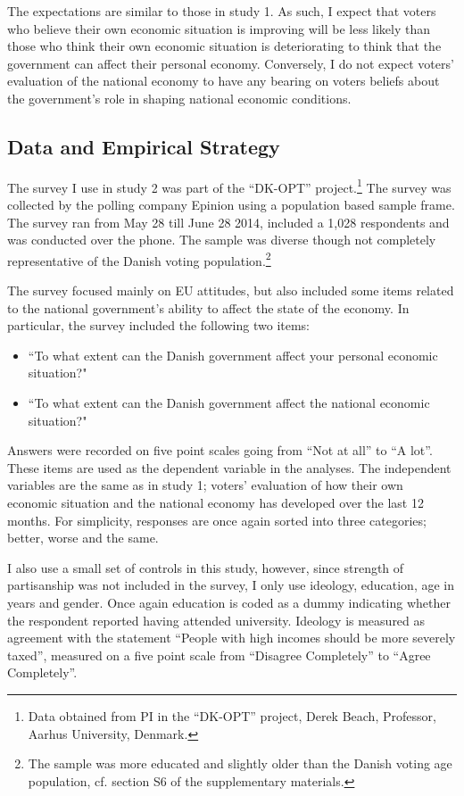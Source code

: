 \documentclass[a4paper,11pt]{article}
\begin{document}
	
	The expectations are similar to those in study 1. As such, I expect that voters who believe their own economic situation is improving will be less likely than those who think their own economic situation is deteriorating to think that the government can affect their personal economy.  Conversely, I do not expect voters' evaluation of the national economy to have any bearing on voters beliefs about the government's role in shaping national economic conditions.
	
	
	
	\subsection*{Data and Empirical Strategy}
	The survey I use in study 2 was part of the ``DK-OPT'' project.\footnote{Data obtained from PI in the ``DK-OPT'' project, Derek Beach,  Professor, Aarhus University, Denmark.} The survey was collected by the polling company Epinion using a population based sample frame. The survey ran from May 28 till June 28 2014, included a 1,028 respondents and was conducted over the phone. The sample was diverse though not completely representative of the Danish voting population.\footnote{The sample was more educated and slightly older than the Danish voting age population, cf. section S6 of the supplementary materials.}
	
	The survey focused mainly on EU attitudes, but also included some items related to the national government's ability to affect the state of the economy. In particular, the survey included the following two items:
	
	\begin{itemize}
		\item ``To what extent can the Danish government affect your personal economic situation?"
		\item ``To what extent can the Danish government affect the national economic situation?"
	\end{itemize}  
	
	Answers were recorded on five point scales going from ``Not at all'' to ``A lot''. These items are used as the dependent variable in the analyses. The independent variables are the same as in study 1; voters' evaluation of how their own economic situation and the national economy has developed over the last 12 months. For simplicity, responses are once again sorted into three categories; better, worse and the same. 
	
	I also use a small set of controls in this study, however, since strength of partisanship was not included in the survey, I only use ideology, education, age in years and gender. Once again education is coded as a dummy indicating whether the respondent reported having attended university. Ideology is measured as agreement with the statement ``People with high incomes should be more severely taxed'', measured on a five point scale from ``Disagree Completely'' to ``Agree Completely''.
	
\end{document}
